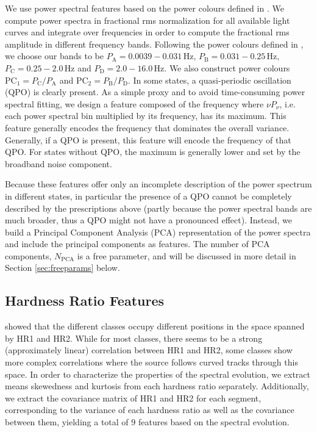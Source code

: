 \documentclass[12pt]{emulateapj}
\begin{document}
We use power spectral features based on the power colours defined in \citep{heil2015}. We compute power spectra in fractional rms normalization for all available light curves and integrate over frequencies in order to compute the fractional rms amplitude in different frequency bands. 
Following the power colours defined in \citet{heil2015}, we choose our bands to be $P_\mathrm{A} = 0.0039-0.031 \,\mathrm{Hz}$, 
$P_\mathrm{B} = 0.031-0.25 \,\mathrm{Hz}$, $P_\mathrm{C} =  0.25-2.0 \,\mathrm{Hz}$ and $P_\mathrm{D} = 2.0-16.0 \,\mathrm{Hz}$. We also construct power colours $\mathrm{PC}_1 = P_\mathrm{C}/P_\mathrm{A}$ and  $\mathrm{PC}_2 = P_\mathrm{B}/P_\mathrm{D}$.
In some states, a quasi-periodic oscillation (QPO) is clearly present. As a simple proxy and to avoid time-consuming power spectral fitting, we design a feature composed of the frequency where $\nu P_\nu$, i.e. each power spectral bin multiplied by its frequency,  has its maximum. This feature generally encodes the frequency that dominates the overall variance. Generally, if a QPO is present, this feature will encode the frequency of that QPO. For states without QPO, the maximum is generally lower and set by the broadband noise component.

Because these features offer only an incomplete description of the power spectrum in different states, in particular the presence of a QPO cannot be completely described by the prescriptions above (partly because the power spectral bands are much broader, thus a QPO might not have a pronounced effect). Instead, we build a Principal Component Analysis (PCA) representation of the power spectra and include the principal components as features. The number of PCA components, $N_\mathrm{PCA}$ is a free parameter, and will be discussed in more detail in Section \ref{sec:freeparams} below. 

\subsection{Hardness Ratio Features}

\citet{belloni2000} showed that the different classes occupy different positions in the space spanned by HR1 and HR2. While for most classes, there seems to be a strong (approximately linear) correlation between HR1 and HR2, some classes show more complex correlations where the source follows curved tracks through this space. In order to characterize the properties of the spectral evolution, we extract means skewedness and kurtosis from each hardness ratio separately. Additionally, we extract the covariance matrix of HR1 and HR2 for each segment, corresponding to the variance of each hardness ratio as well as the covariance between them, yielding a total of $9$ features based on the spectral evolution.
\end{document}
